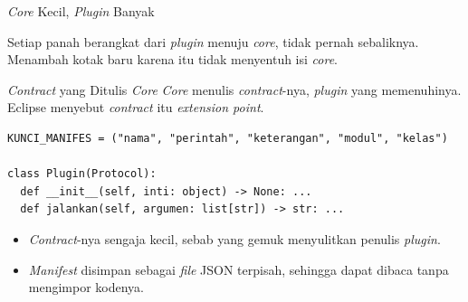 \documentclass[aspectratio=169, table, 12pt]{beamer}
\begin{document}
\begin{frame}{{\Large \textit{Core} Kecil, \textit{Plugin} Banyak}}
  \vspace{10pt}
  \centering

  \vspace{8pt}
  {\small Setiap panah berangkat dari \textit{plugin} menuju \textit{core},
  tidak pernah sebaliknya. Menambah kotak baru karena itu tidak
  menyentuh isi \textit{core}.}
\end{frame}

\begin{frame}[fragile]{{\Large \textit{Contract} yang Ditulis \textit{Core}}}
  \vspace{6pt}
  {\small \textit{Core} menulis \textit{contract}-nya, \textit{plugin} yang memenuhinya. Eclipse
  menyebut \textit{contract} itu \textit{extension point}.}
  \vspace{4pt}
\begin{lstlisting}[style=PythonStyle]
KUNCI_MANIFES = ("nama", "perintah", "keterangan", "modul", "kelas")

class Plugin(Protocol):
  def __init__(self, inti: object) -> None: ...
  def jalankan(self, argumen: list[str]) -> str: ...
\end{lstlisting}
  \vspace{4pt}
  \begin{itemize}\small
    \item \textit{Contract}-nya sengaja kecil, sebab yang gemuk menyulitkan penulis
          \textit{plugin}.
    \item \textit{Manifest} disimpan sebagai \textit{file} JSON terpisah, sehingga dapat dibaca
          tanpa mengimpor kodenya.
  \end{itemize}
\end{frame}
\end{document}
